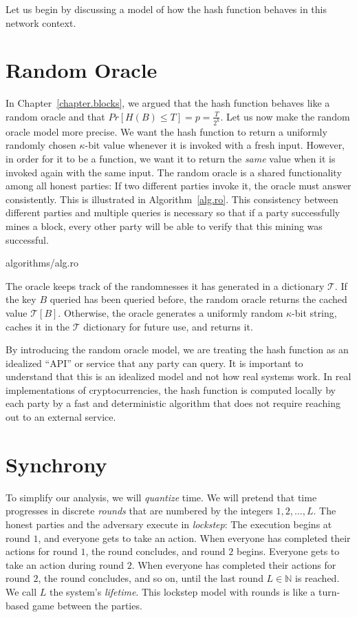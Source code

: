 Let us begin by discussing a model of how the hash function behaves in this network context.

\section{Random Oracle}

In Chapter~\ref{chapter.blocks}, we argued that the hash function behaves like a random
oracle and that $Pr[H(B) \leq T] = p = \frac{T}{2^k}$. Let us now make the random oracle
model more precise. We want the hash function to return a uniformly randomly chosen $\kappa$-bit
value whenever it is invoked with a fresh input. However, in order for it to be a function,
we want it to return the \emph{same} value when it is invoked again with the same input.
The random oracle is a shared functionality among all honest parties: If two different parties
invoke it, the oracle must answer consistently. This is illustrated in Algorithm~\ref{alg.ro}.
This consistency between different parties and multiple queries is necessary so that if
a party successfully mines a block, every other party will be able to verify that this
mining was successful.

{algorithms/alg.ro}

The oracle keeps track of the randomnesses it has generated in a dictionary $\mathcal{T}$. If
the key $B$ queried has been queried before, the random oracle returns the cached value $\mathcal{T}[B]$.
Otherwise, the oracle generates a uniformly random $\kappa$-bit string, caches it in the $\mathcal{T}$
dictionary for future use, and returns it.

By introducing the random oracle model, we are treating the hash function as an idealized ``API''
or service that any party can query. It is important to understand that this is an idealized model
and not how real systems work. In real implementations of cryptocurrencies, the hash function is
computed locally by each party by a fast and deterministic algorithm that does not require reaching
out to an external service.

\section{Synchrony}

To simplify our analysis, we will \emph{quantize} time. We will pretend that time progresses in
discrete \emph{rounds} that are numbered by the integers $1, 2, \ldots, L$. The honest parties
and the adversary execute in \emph{lockstep}: The execution begins at round $1$, and everyone gets
to take an action. When everyone has completed their actions for round $1$, the round concludes,
and round $2$ begins. Everyone gets to take an action during round $2$. When everyone has completed
their actions for round $2$, the round concludes, and so on, until the last round $L \in \mathbb{N}$
is reached. We call $L$ the system's \emph{lifetime}. This lockstep model with rounds is like
a turn-based game between the parties.

